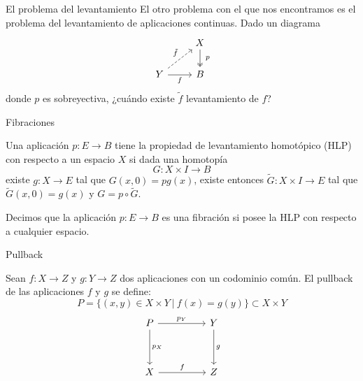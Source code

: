 
\begin{frame}[fragile]{El problema del levantamiento}
El otro problema con el que nos encontramos es el problema del levantamiento de aplicaciones continuas. Dado un diagrama
$$
\begin{tikzcd}
	{}	& X \dar[two heads]{\ p} \\
	Y \urar[dashed]{\tilde{f}} \rar[swap]{f} & B
\end{tikzcd}
$$
donde $p$ es sobreyectiva, ¿cuándo existe $\tilde{f}$ levantamiento de $f$?
\end{frame}

\begin{frame}[fragile]{Fibraciones}
\begin{defin}
Una aplicación $p : E \longrightarrow B$ tiene la \alert{propiedad de levantamiento homotópico} (HLP) con respecto a un espacio $X$ si dada una homotopía 
\[
G : X \times I \longrightarrow B
\]
existe $g : X \longrightarrow E$ tal que  $G(x, 0) = pg(x)$, existe entonces $\widetilde{G} : X \times I \longrightarrow E$ tal que $\widetilde{G}(x,0) = g(x)$ y $G = p \circ \widetilde{G}$.
\end{defin}
\par \pause
\begin{defin}
Decimos que la aplicación $p : E \longrightarrow B$ es una \alert{fibración} si posee la HLP con respecto a cualquier espacio.
\end{defin}
\end{frame}

\begin{frame}[fragile]{Pullback}
\begin{defin}
Sean $f : X \longrightarrow Z$ y $g: Y \longrightarrow Z$ dos aplicaciones con un codominio común. El pullback de las aplicaciones $f$ y $g$ se define: 
\[P = \{ (x, y) \in X \times Y \ \vert \ f(x) = g(y) \} \subset X \times Y \]
\[
\begin{tikzcd}
P \arrow{rr}{p_Y} \arrow{dd}{p_X} && Y \arrow{dd}{g} \\
\\
X \arrow{rr}{f} && Z
\end{tikzcd}
\]
\end{defin}
\end{frame}

